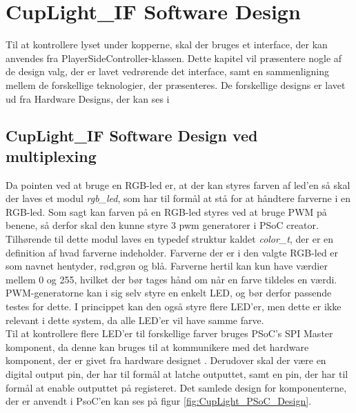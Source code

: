 \documentclass[Softwaredesign/Softwaredesign_main.tex]{subfiles}
\begin{document}
\section{CupLight\_IF Software Design}
Til at kontrollere lyset under kopperne, skal der bruges et interface, der kan anvendes fra PlayerSideController-klassen. Dette kapitel vil præsentere nogle af de design valg, der er lavet vedrørende det interface, samt en sammenligning mellem de forskellige teknologier, der præsenteres. De forskellige designs er lavet ud fra Hardware Designs, der kan ses i 
\subsection{CupLight\_IF Software Design ved multiplexing}
Da pointen ved at bruge en RGB-led er, at der kan styres farven af led'en så skal der laves  et modul \textit{rgb\_led}, som har til formål at stå for at håndtere farverne i en RGB-led. Som sagt kan farven på en RGB-led styres ved at bruge PWM på benene, så derfor skal den kunne styre 3 pwm generatorer i PSoC creator. Tilhørende til dette modul laves en typedef struktur kaldet \textit{color\_t}, der er en definition af hvad farverne indeholder. Farverne der er i den valgte RGB-led er som navnet hentyder, rød,grøn og blå. Farverne hertil kan kun have værdier mellem 0 og 255, hvilket der bør tages hånd om når en farve tildeles en værdi.
\\ PWM-generatorne kan i sig selv styre en enkelt LED, og bør derfor passende testes for dette. I princippet kan den også styre flere LED'er, men dette er ikke relevant i dette system, da alle LED'er vil have samme farve.
\\Til at kontrollere flere LED'er til forskellige farver bruges PSoC's SPI Master komponent, da denne kan bruges til at kommunikere med det hardware komponent, der er givet fra hardware designet . Derudover skal der være en digital output pin, der har til formål at latche outputtet, samt en pin, der har til formål at enable outputtet på registeret. Det samlede design for komponenterne, der er anvendt i PsoC'en kan ses på figur \ref{fig:CupLight_PSoC_Design}.
\end{document}
